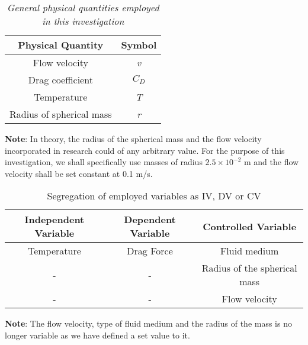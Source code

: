\begin{table}[H]
    \centering
        \begin{tabular}{|c|c|}
        \hline
        \hline
        {Physical Quantity} & {Symbol} \\
        \hline
        \hline
        {Flow velocity} & \textit{v} \\
        \hline
        {Drag coefficient} & \textit{$C_D$} \\
		\hline        
        {Temperature} & \textit{T} \\
        \hline
        {Radius of spherical mass} & \textit{r} \\
        \hline
        \hline
        \end{tabular}
    \caption{\textit{General physical quantities employed in this investigation}}
\end{table}

{\textbf{Note}: In theory, the radius of the spherical mass and the flow velocity  incorporated in research could of any arbitrary value. For the purpose of this investigation, we shall specifically use masses of radius $2.5\times10^{-2}$ m and the flow velocity shall be set constant at 0.1 m/s.}

\begin{table}[H]
    \centering
        \begin{tabular}{|c|c|c|}
        \hline
        \hline
        {Independent Variable} & {Dependent Variable} & {Controlled Variable} \\
        \hline
        \hline
        {Temperature} & {Drag Force} & {Fluid medium} \\
        \hline
        {-} & {-} & {Radius of the spherical mass} \\
        \hline
        {-} & {-} & {Flow velocity} \\
        \hline
        \hline
        \end{tabular}
    \caption{{Segregation of employed variables as IV, DV or CV}}
\end{table}

{\textbf{Note}: The flow velocity, type of fluid medium and the radius of the mass is no longer variable as we have defined a set value to it.}

